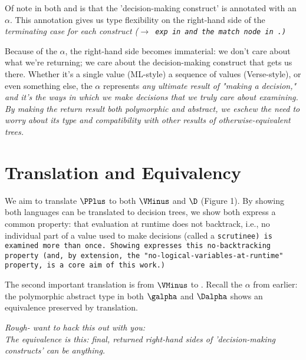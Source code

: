 \documentclass{article}
\begin{document}
Of note in both {\VMinus} and {\D} is that the 'decision-making construct' is 
annotated with an $\alpha$. This annotation gives us type flexibility on the 
right-hand side of the \it{terminating} case for each construct 
(\tt{$\rightarrow$ exp} in {\VMinus} and the match node in {\D}.) 

Because of the $\alpha$, the right-hand side becomes immaterial: we don't care
about what we're returning; we care about the decision-making construct that
gets us there. Whether it's a single value (ML-style) a sequence of values
(Verse-style), or even something else, the $\alpha$ represents \it{any} ultimate
result of "making a decision," and it's the ways in which we make decisions that
we truly care about examining. By making the return result both polymorphic and
abstract, we eschew the need to worry about its type and compatibility with
other results of otherwise-equivalent trees. 

\section{Translation and Equivalency}

We aim to translate ${\PPlus}$ to both ${\VMinus}$ and ${\D}$ (Figure 1). By showing both
languages can be translated to decision trees, we show both express a common
property: that evaluation at runtime does not backtrack, i.e., no individual
part of a value used to make decisions (called a \tt{scrutinee}) is examined
more than once. Showing {\VMinus} expresses this no-backtracking property (and, by
extension, the "no-logical-variables-at-runtime" property, is a core aim of this
work.)

The second important translation is from ${\VMinus}$ to {\D}. Recall the $\alpha$ from
earlier: the polymorphic abstract type in both $\galpha$ and $\Dalpha$ shows
an equivalence preserved by translation. 

\it{Rough- want to hack this out with you:} \\
The equivalence is this: final, returned right-hand sides of 'decision-making 
constructs' can be anything. 
\end{document}
